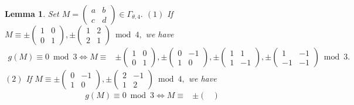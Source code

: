 \documentclass[12pt]{article}
\theoremstyle{definition}
\newtheorem{lemma}[theorem]{Lemma}
\numberwithin{equation}{section}
\numberwithin{theorem}{section}
\begin{document}
\begin{lemma}
\label{lem:level4-mod3}
{\it
Set 
$
M=
\begin{pmatrix}
a & b \\
c & d
\end{pmatrix}
\in\Gamma_{\theta,4}.
$
\newline
$\mathrm{(1)}$ If 
$
M
\equiv
\pm
\begin{pmatrix}
1 & 0 \\
0 & 1
\end{pmatrix}, 
\pm
\begin{pmatrix}
1 & 2 \\
2 & 1
\end{pmatrix}
\bmod{4},
$ 
we have 
\begin{align*}
g(M)\equiv 0 \bmod{3} 
\Longleftrightarrow
M
\equiv& 
\pm
\begin{pmatrix}
1 & 0 \\
0 & 1
\end{pmatrix}, 
\pm
\begin{pmatrix}
0 & -1 \\
1 & 0
\end{pmatrix}, 
\pm
\begin{pmatrix}
1 & 1 \\
1 & -1
\end{pmatrix},  
\pm
\begin{pmatrix}
1 & -1 \\
-1 & -1
\end{pmatrix}
\bmod{3}.   %
\end{align*}
\newline
$\mathrm{(2)}$ If 
$
M
\equiv
\pm
\begin{pmatrix}
0 & -1 \\
1 & 0
\end{pmatrix}, 
\pm
\begin{pmatrix}
2 & -1 \\
1 & 2
\end{pmatrix}
\bmod{4},
$ 
we have 
\begin{align*}
g(M)\equiv 0 \bmod{3} 
\Longleftrightarrow
M
\equiv& 
\pm
\begin{pmatrix}

\end{pmatrix}
\end{align*}}
\end{lemma}
\end{document}

